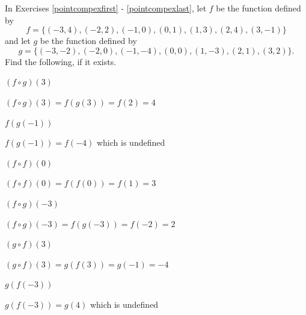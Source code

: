 \documentclass{ximera}
\begin{document}
\begin{question}
In Exercises \ref{pointcompexfirst} - \ref{pointcompexlast}, let $f$ be the function defined by \[f = \{(-3, 4), (-2, 2), (-1, 0), (0, 1), (1, 3), (2, 4), (3, -1)\}\] and let $g$ be the function defined by \[g = \{(-3, -2), (-2, 0), (-1, -4), (0, 0), (1, -3), (2, 1), (3, 2)\}.\]  Find the following, if it exists.

\begin{problem}\label{pointcompexfirst}
$(f \circ g)(3)$

\begin{solution}
    $(f \circ g)(3)= f(g(3)) = f(2) = 4$
\end{solution}
\end{problem}

\begin{problem}
$f(g(-1))$

\begin{solution}
    $f(g(-1)) = f(-4)$ which is undefined
\end{solution}
\end{problem}

\begin{problem}
$(f \circ f)(0)$

\begin{solution}
$(f \circ f)(0) = f(f(0)) = f(1) = 3$
\end{solution}
\end{problem}

\begin{problem}
$(f \circ g)(-3)$

\begin{solution}
    $(f \circ g)(-3) = f(g(-3)) = f(-2) = 2$
\end{solution}
\end{problem}

\begin{problem}
$(g \circ f)(3)$

\begin{solution}
    $(g \circ f)(3) = g(f(3)) = g(-1) = -4$
\end{solution}
\end{problem}

\begin{problem}
$g(f(-3))$

\begin{solution}
    $g(f(-3)) = g(4)$ which is undefined
\end{solution}
\end{problem}


\end{question}
\end{document}
